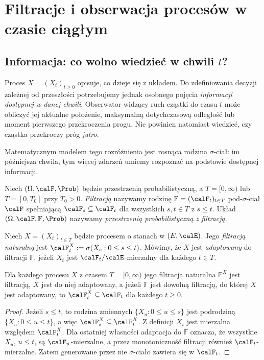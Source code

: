 \chapter{Filtracje i obserwacja procesów w czasie ciągłym}
\label{ch:filtracje}

\section{Informacja: co wolno wiedzieć w chwili \texorpdfstring{$t$}{t}?}
Proces $X=(X_t)_{t\ge0}$ opisuje, co dzieje się z układem.
Do zdefiniowania decyzji zależnej od przeszłości potrzebujemy jednak
osobnego pojęcia \emph{informacji dostępnej w danej chwili}.
Obserwator widzący ruch cząstki do czasu $t$ może obliczyć jej
aktualne położenie, maksymalną dotychczasową odległość lub moment
pierwszego przekroczenia progu. Nie powinien natomiast wiedzieć,
czy cząstka przekroczy próg \emph{jutro}.

Matematycznym modelem tego rozróżnienia jest rosnąca rodzina
$\sigma$-ciał: im późniejsza chwila, tym więcej zdarzeń umiemy
rozpoznać na podstawie dostępnej informacji.

\begin{definicja}
Niech $(\Omega,\calF,\Prob)$ będzie przestrzenią
probabilistyczną, a $T=[0,\infty)$ lub $T=[0,T_0]$
przy $T_0>0$. \emph{Filtracją} nazywamy rodzinę
$\mathbb F=(\calF_t)_{t\in T}$ pod-$\sigma$-ciał $\calF$
spełniającą $\calF_s\subseteq\calF_t$ dla wszystkich
$s,t\in T$ z $s\le t$. Układ
$(\Omega,\calF,\mathbb F,\Prob)$ nazywamy
\emph{przestrzenią probabilistyczną z filtracją}.
\end{definicja}

\begin{definicja}
Niech $X=(X_t)_{t\in T}$ będzie procesem o stanach w
$(E,\calE)$. Jego \emph{filtracją naturalną} jest
$\calF_t^X:=\sigma(X_s:0\le s\le t)$.
Mówimy, że $X$ jest \emph{adaptowany} do filtracji
$\mathbb F$, jeżeli $X_t$ jest $\calF_t/\calE$-mierzalny
dla każdego $t\in T$.
\end{definicja}

\begin{stwierdzenie}
Dla każdego procesu $X$ z czasem $T=[0,\infty)$
jego filtracja naturalna $\mathbb F^X$ jest filtracją,
$X$ jest do niej adaptowany, a jeżeli $\mathbb F$
jest dowolną filtracją, do której $X$ jest adaptowany,
to $\calF_t^X\subseteq\calF_t$ dla każdego $t\ge0$.
\end{stwierdzenie}
\begin{proof}
Jeżeli $s\le t$, to rodzina zmiennych
$\{X_u:0\le u\le s\}$ jest podrodziną
$\{X_u:0\le u\le t\}$, a więc
$\calF_s^X\subseteq\calF_t^X$.
Z definicji $X_t$ jest mierzalna względem
$\calF_t^X$. Dla ostatniej własności
adaptacja do $\mathbb F$ oznacza, że wszystkie
$X_u$, $u\le t$, są $\calF_u$-mierzalne,
a przez monotoniczność filtracji również
$\calF_t$-mierzalne. Zatem generowane przez nie
$\sigma$-ciało zawiera się w $\calF_t$.
\end{proof}

